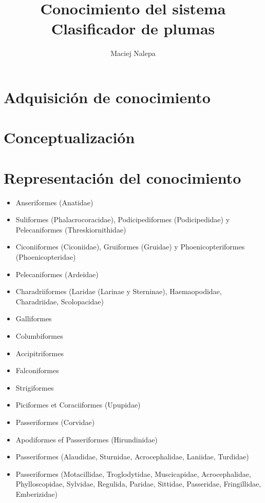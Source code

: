 \documentclass[a4paper,12pt]{article}
\title{Conocimiento del sistema\\ \normalsize{Clasificador de plumas}}
\author{Maciej Nalepa}
\begin{document}
\maketitle

\section{Adquisición de conocimiento}

\section{Conceptualización}

\section{Representación del conocimiento}

\begin{itemize}
	\item Anseriformes (Anatidae)
	\item Suliformes (Phalacrocoracidae), Podicipediformes (Podicipedidae) y Pelecaniformes (Threskiornithidae)
	\item Ciconiiformes (Ciconiidae), Gruiformes (Gruidae) y Phoenicopteriformes (Phoenicopteridae)
	\item Pelecaniformes (Ardeidae)
	\item Charadriiformes (Laridae (Larinae y Sterninae), Haemaopodidae, Charadriidae, Scolopacidae)
	\item Galliformes
	\item Columbiformes
	\item Accipitriformes
	\item Falconiformes
	\item Strigiformes
	\item Piciformes et Coraciiformes (Upupidae)
	\item Passeriformes (Corvidae)
	\item Apodiformes ef Passeriformes (Hirundinidae)
	\item Passeriformes (Alaudidae, Sturnidae, Acrocephalidae, Laniidae, Turdidae)
	\item Passeriformes (Motacillidae, Troglodytidae, Muscicapidae, Acrocephalidae, Phylloscopidae, Sylvidae, Regulida, Paridae, Sittidae, Passeridae, Fringillidae, Emberizidae)
\end{itemize}
\end{document}
